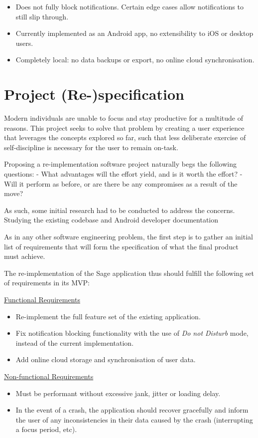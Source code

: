 \begin{itemize}
    \item Does not fully block notifications. Certain edge cases allow notifications to still slip through.
    \item Currently implemented as an Android app, no extensibility to iOS or desktop users.
    \item Completely local: no data backups or export, no online cloud synchronisation.
\end{itemize}


\section{Project (Re-)specification}
Modern individuals are unable to focus and stay productive for a multitude of reasons. This project seeks to solve that problem by creating a user experience that leverages the concepts explored so far, such that less deliberate exercise of self-discipline is necessary for the user to remain on-task.

Proposing a re-implementation software project naturally begs the following questions:
- What advantages will the effort yield, and is it worth the effort?
- Will it perform as before, or are there be any compromises as a result of the move?

As such, some initial research had to be conducted to address the concerns.
Studying the existing codebase and Android developer documentation

As in any other software engineering problem, the first step is to gather an initial list of requirements that will form the specification of what the final product must achieve.

The re-implementation of the Sage application thus should fulfill the following set of requirements in its MVP:

\underline{Functional Requirements}
\begin{itemize}
    \item Re-implement the full feature set of the existing application.
    \item Fix notification blocking functionality with the use of \textit{Do not Disturb} mode, instead of the current implementation.
    \item Add online cloud storage and synchronisation of user data.
\end{itemize}

\underline{Non-functional Requirements}
\begin{itemize}
    \item Must be performant without excessive jank, jitter or loading delay.
    \item In the event of a crash, the application should recover gracefully and inform the user of any inconsistencies in their data caused by the crash (interrupting a focus period, etc).
\end{itemize}


